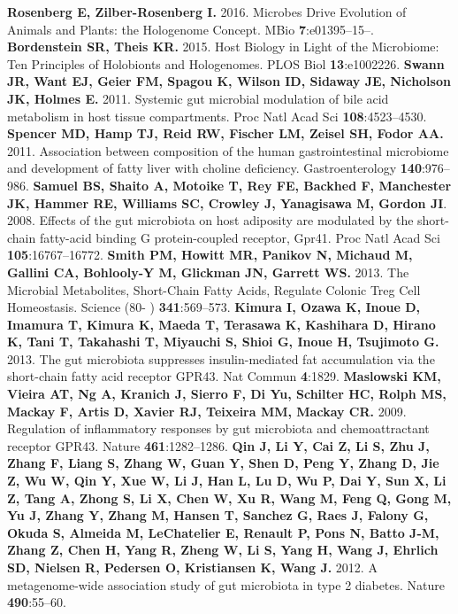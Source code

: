 \documentclass[12pt,oneside,letterpaper]{article}
\begin{document}
\clearpage
\begin{thebibliography}{99}
 {\bf Rosenberg E, Zilber-Rosenberg I.} 2016. Microbes Drive Evolution of Animals and Plants: the Hologenome Concept. MBio {\bf 7}:e01395–15–.
 {\bf Bordenstein SR, Theis KR.} 2015. Host Biology in Light of the Microbiome: Ten Principles of Holobionts and Hologenomes. PLOS Biol {\bf 13}:e1002226.
 {\bf Swann JR, Want EJ, Geier FM, Spagou K, Wilson ID, Sidaway JE, Nicholson JK, Holmes E.} 2011. Systemic gut microbial modulation of bile acid metabolism in host tissue compartments. Proc Natl Acad Sci {\bf 108}:4523–4530.
 {\bf Spencer MD, Hamp TJ, Reid RW, Fischer LM, Zeisel SH, Fodor AA.} 2011. Association between composition of the human gastrointestinal microbiome and development of fatty liver with choline deficiency. Gastroenterology {\bf 140}:976–986.
 {\bf Samuel BS, Shaito A, Motoike T, Rey FE, Backhed F, Manchester JK, Hammer RE, Williams SC, Crowley J, Yanagisawa M, Gordon JI}. 2008. Effects of the gut microbiota on host adiposity are modulated by the short-chain fatty-acid binding G protein-coupled receptor, Gpr41. Proc Natl Acad Sci {\bf 105}:16767–16772.
 {\bf Smith PM, Howitt MR, Panikov N, Michaud M, Gallini CA, Bohlooly-Y M, Glickman JN, Garrett WS.} 2013. The Microbial Metabolites, Short-Chain Fatty Acids, Regulate Colonic Treg Cell Homeostasis. Science (80- ) {\bf 341}:569–573.
 {\bf Kimura I, Ozawa K, Inoue D, Imamura T, Kimura K, Maeda T, Terasawa K, Kashihara D, Hirano K, Tani T, Takahashi T, Miyauchi S, Shioi G, Inoue H, Tsujimoto G.} 2013. The gut microbiota suppresses insulin-mediated fat accumulation via the short-chain fatty acid receptor GPR43. Nat Commun {\bf 4}:1829.
 {\bf Maslowski KM, Vieira AT, Ng A, Kranich J, Sierro F, Di Yu, Schilter HC, Rolph MS, Mackay F, Artis D, Xavier RJ, Teixeira MM, Mackay CR.} 2009. Regulation of inflammatory responses by gut microbiota and chemoattractant receptor GPR43. Nature {\bf 461}:1282–1286.
 {\bf Qin J, Li Y, Cai Z, Li S, Zhu J, Zhang F, Liang S, Zhang W, Guan Y, Shen D, Peng Y, Zhang D, Jie Z, Wu W, Qin Y, Xue W, Li J, Han L, Lu D, Wu P, Dai Y, Sun X, Li Z, Tang A, Zhong S, Li X, Chen W, Xu R, Wang M, Feng Q, Gong M, Yu J, Zhang Y, Zhang M, Hansen T, Sanchez G, Raes J, Falony G, Okuda S, Almeida M, LeChatelier E, Renault P, Pons N, Batto J-M, Zhang Z, Chen H, Yang R, Zheng W, Li S, Yang H, Wang J, Ehrlich SD, Nielsen R, Pedersen O, Kristiansen K, Wang J.} 2012. A metagenome-wide association study of gut microbiota in type 2 diabetes. Nature {\bf 490}:55–60.

\end{thebibliography}
\end{document}
